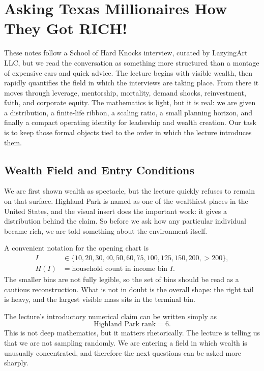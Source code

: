 \chapter{Asking Texas Millionaires How They Got RICH!}

These notes follow a School of Hard Knocks interview, curated by LazyingArt LLC, but we read the conversation as something more structured than a montage of expensive cars and quick advice. The lecture begins with visible wealth, then rapidly quantifies the field in which the interviews are taking place. From there it moves through leverage, mentorship, mortality, demand shocks, reinvestment, faith, and corporate equity. The mathematics is light, but it is real: we are given a distribution, a finite-life ribbon, a scaling ratio, a small planning horizon, and finally a compact operating identity for leadership and wealth creation. Our task is to keep those formal objects tied to the order in which the lecture introduces them.

\section{Wealth Field and Entry Conditions}

We are first shown wealth as spectacle, but the lecture quickly refuses to remain on that surface. Highland Park is named as one of the wealthiest places in the United States, and the visual insert does the important work: it gives a distribution behind the claim. So before we ask how any particular individual became rich, we are told something about the environment itself.

A convenient notation for the opening chart is
\begin{align}
I &\in \{10,20,30,40,50,60,75,100,125,150,200,>200\},\\
H(I) &= \text{household count in income bin } I.
\end{align}
The smaller bins are not fully legible, so the set of bins should be read as a cautious reconstruction. What is not in doubt is the overall shape: the right tail is heavy, and the largest visible mass sits in the terminal bin.

The lecture's introductory numerical claim can be written simply as
\begin{equation}
\text{Highland Park rank}=6.
\end{equation}
This is not deep mathematics, but it matters rhetorically. The lecture is telling us that we are not sampling randomly. We are entering a field in which wealth is unusually concentrated, and therefore the next questions can be asked more sharply.

